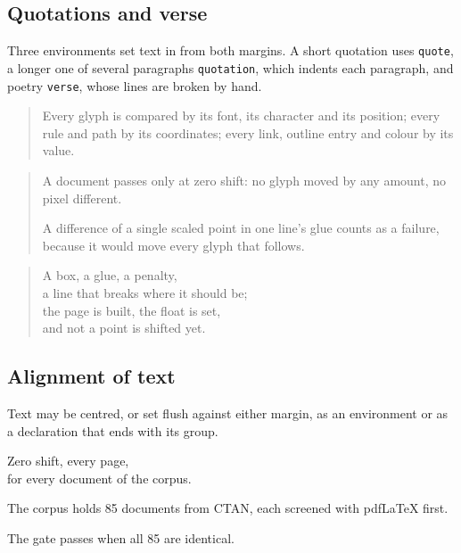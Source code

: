 \documentclass{article}
\numberwithin{equation}{section}
\theoremstyle{definition}
\theoremstyle{remark}
\begin{document}
\subsection{Quotations and verse}

Three environments set text in from both margins. A short quotation uses
\texttt{quote}, a longer one of several paragraphs \texttt{quotation}, which indents
each paragraph, and poetry \texttt{verse}, whose lines are broken by hand.

\begin{quote}
Every glyph is compared by its font, its character and its position; every rule and
path by its coordinates; every link, outline entry and colour by its value.
\end{quote}

\begin{quotation}
A document passes only at zero shift: no glyph moved by any amount, no pixel different.

A difference of a single scaled point in one line's glue counts as a failure, because
it would move every glyph that follows.
\end{quotation}

\begin{verse}
A box, a glue, a penalty,\\
a line that breaks where it should be;\\
the page is built, the float is set,\\
and not a point is shifted yet.
\end{verse}

\subsection{Alignment of text}

Text may be centred, or set flush against either margin, as an environment or as a
declaration that ends with its group.

\begin{center}
Zero shift, every page,\\
for every document of the corpus.
\end{center}

\begin{flushleft}
The corpus holds 85 documents from CTAN, each screened with pdfLaTeX first.
\end{flushleft}

\begin{flushright}
The gate passes when all 85 are identical.
\end{flushright}
\end{document}
